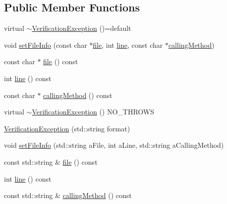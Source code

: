 \subsection*{Public Member Functions}
\begin{DoxyCompactItemize}
\item 
virtual \mbox{\hyperlink{structfakeit_1_1VerificationException_a3b59826b297c4022ab36f06237daaba7}{$\sim$\+Verification\+Exception}} ()=default
\item 
void \mbox{\hyperlink{structfakeit_1_1VerificationException_a70b6c8675f005de5a0af6d4d0bee5cd4}{set\+File\+Info}} (const char $\ast$\mbox{\hyperlink{structfakeit_1_1VerificationException_a6a986aae786e9bcbe0fb523a671e5184}{file}}, int \mbox{\hyperlink{structfakeit_1_1VerificationException_a8b1f759f2f939b5f1a84aa1f8b45fd81}{line}}, const char $\ast$\mbox{\hyperlink{structfakeit_1_1VerificationException_ac64a1175b7ab81f1375ceabef824f3a8}{calling\+Method}})
\item 
const char $\ast$ \mbox{\hyperlink{structfakeit_1_1VerificationException_a6a986aae786e9bcbe0fb523a671e5184}{file}} () const
\item 
int \mbox{\hyperlink{structfakeit_1_1VerificationException_a8b1f759f2f939b5f1a84aa1f8b45fd81}{line}} () const
\item 
const char $\ast$ \mbox{\hyperlink{structfakeit_1_1VerificationException_ac64a1175b7ab81f1375ceabef824f3a8}{calling\+Method}} () const
\item 
virtual \mbox{\hyperlink{structfakeit_1_1VerificationException_aa0e95a9d61ff4d6aeb185cadb033fc93}{$\sim$\+Verification\+Exception}} () N\+O\+\_\+\+T\+H\+R\+O\+WS
\item 
\mbox{\hyperlink{structfakeit_1_1VerificationException_acd3b36e04c5069bdfa5ba9ec4c4b16bc}{Verification\+Exception}} (std\+::string format)
\item 
void \mbox{\hyperlink{structfakeit_1_1VerificationException_a4b0bc0c4ef705187fc836a6d0762e19e}{set\+File\+Info}} (std\+::string a\+File, int a\+Line, std\+::string a\+Calling\+Method)
\item 
const std\+::string \& \mbox{\hyperlink{structfakeit_1_1VerificationException_a6accc65751a7d8025062e9c56f5656fd}{file}} () const
\item 
int \mbox{\hyperlink{structfakeit_1_1VerificationException_a8b1f759f2f939b5f1a84aa1f8b45fd81}{line}} () const
\item 
const std\+::string \& \mbox{\hyperlink{structfakeit_1_1VerificationException_aea0cb7b486b1fd95f80138cef5759953}{calling\+Method}} () const

\end{DoxyCompactItemize}
